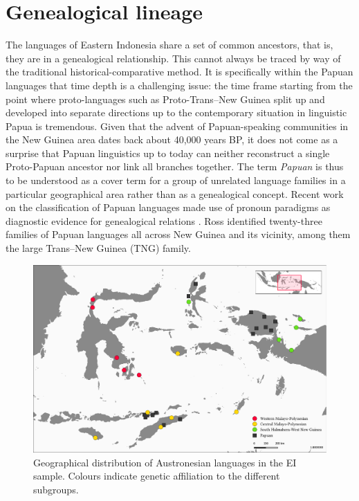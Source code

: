 \section{Genealogical lineage}\label{sec:geneticlineage}

The languages of Eastern Indonesia share a set of common ancestors, that is, they are in a genealogical relationship. This cannot always be traced by way of the traditional historical-comparative method. It is specifically within the Papuan languages that time depth is a challenging issue: the time frame starting from the point where proto-languages such as Proto-Trans--New Guinea split up and developed into separate directions up to the contemporary situation in linguistic Papua is tremendous. Given that the advent of Papuan-speaking communities in the New Guinea area dates back about 40,000 years BP, it does not come as a surprise that Papuan linguistics up to today can neither reconstruct a single Proto-Papuan ancestor nor link all branches together. The term \textit{Papuan} is thus to be understood as a cover term for a group of unrelated language families in a particular geographical area rather than as a genealogical concept. Recent work on the classification of Papuan languages made use of pronoun paradigms as diagnostic evidence for genealogical relations \citep{Ross2005}. Ross identified twenty-three families of Papuan languages all across New Guinea and its vicinity, among them the large Trans--New Guinea (TNG) family.

\begin{figure}
	\includegraphics[width=\columnwidth]{figures/languages_aff_aus.pdf}
	\caption[Geographical distribution of Austronesian languages in the sample]{Geographical distribution of Austronesian languages in the EI sample. Colours indicate genetic affiliation to the different subgroups.}\label{map:Austro1}
\end{figure}


